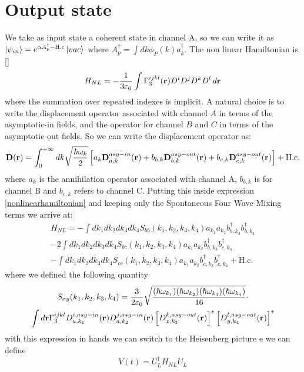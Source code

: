 \section{Output state}
We take as input state a coherent state in channel A, so we can write it as $\ket{\psi_{in}} = e^{\alpha A_p^\dagger - \text{H.c}}\ket{vac}$ where $A_p^\dagger = \int dk \phi_P(k) a_k^\dagger$. The non linear Hamiltonian is []
\begin{equation}\label{nonlinearhamiltonian}H_{NL} = -\frac{1}{3\varepsilon_0}\int\Gamma^{ijkl}_3(\mathbf{r})D^iD^jD^kD^l\,d\mathbf{r}\end{equation}
where the summation over repeated indexes is implicit. A natural choice is to write the displacement operator associated with channel $A$ in terms of the asymptotic-in fields, and the operator for channel $B$ and $C$ in terms of the asymptotic-out fields. So we can write the displacement operator as:
\begin{equation}\mathbf{D}(\mathbf{r}) = \int_0^{+\infty}dk\sqrt{\frac{\hbar\omega_k}{2}}\left[a_{k}\mathbf{D}^{asy-in}_{a,k}(\mathbf{r})+b_{b,k}\mathbf{D}^{asy-out}_{b,k}(\mathbf{r})+b_{c,k}\mathbf{D}^{asy-out}_{c,k}(\mathbf{r})\right] +\text{H.c.}\end{equation}
where $a_k$ is the annihilation operator associated with channel A, $b_{b,k}$ is for channel B and $b_{c,k}$ refers to channel C. Putting this inside expression \eqref{nonlinearhamiltonian} and keeping only the Spontaneous Four Wave Mixing terms we arrive at:
\begin{multline}H_{NL} = -\int dk_1dk_2dk_3dk_4S_{bb}(k_1,k_2,k_3,k_4)a_{k_1}a_{k_2}b_{b,k_3}^\dagger b_{b,k_4}^\dagger \\-2\int dk_1dk_2dk_3dk_4S_{bc}(k_1,k_2,k_3,k_4)a_{k_1}a_{k_2}b_{b,k_3}^\dagger b_{c,k_4}^\dagger\\ -\int dk_1dk_2dk_3dk_4S_{cc}(k_1,k_2,k_3,k_4)a_{k_1}a_{k_2}b_{c,k_3}^\dagger b_{c,k_4}^\dagger +\text{H.c.}\end{multline}
where we defined the following quantity
\begin{multline}\label{S}
S_{xy}(k_1,k_2,k_3,k_4) = \frac{3}{2\varepsilon_0}\sqrt{\frac{(\hbar\omega_{k_1})(\hbar\omega_{k_2})(\hbar\omega_{k_3})(\hbar\omega_{k_4})}{16}}\cdot \\ \int d\mathbf{r} \Gamma^{ijkl}_3D^{i,asy-in}_{a,k_1}(\mathbf{r})D^{j,asy-in}_{a,k_2}(\mathbf{r})\left[D^{k,asy-out}_{x,k_3}(\mathbf{r})\right]^*\left[D^{l,asy-out}_{y,k_4}(\mathbf{r})\right]^*
\end{multline}
with this expression in hands we can switch to the Heisenberg picture e we can define
\begin{equation}\label{potential}
V(t) = U_L^\dagger H_{NL}U_{L}\end{equation}
